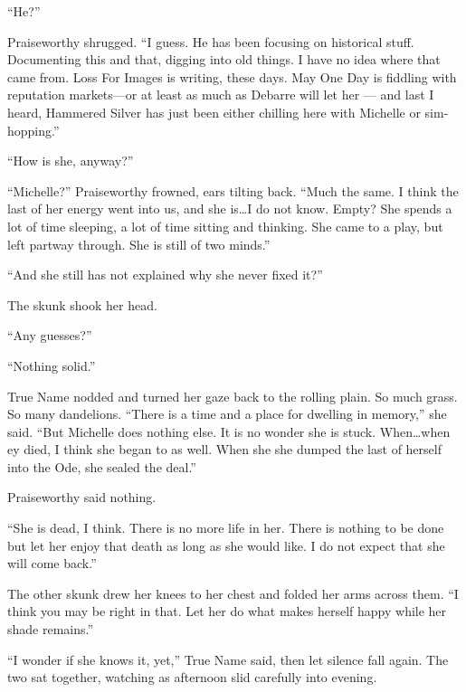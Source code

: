 ``He?''

Praiseworthy shrugged. ``I guess. He has been focusing on historical stuff. Documenting this and that, digging into old things. I have no idea where that came from. Loss For Images is writing, these days. May One Day is fiddling with reputation markets---or at least as much as Debarre will let her — and last I heard, Hammered Silver has just been either chilling here with Michelle or sim-hopping.''

``How is she, anyway?''

``Michelle?'' Praiseworthy frowned, ears tilting back. ``Much the same. I think the last of her energy went into us, and she is\ldots I do not know. Empty? She spends a lot of time sleeping, a lot of time sitting and thinking. She came to a play, but left partway through. She is still of two minds.''

``And she still has not explained why she never fixed it?''

The skunk shook her head.

``Any guesses?''

``Nothing solid.''

True Name nodded and turned her gaze back to the rolling plain. So much grass. So many dandelions. ``There is a time and a place for dwelling in memory,'' she said. ``But Michelle does nothing else. It is no wonder she is stuck. When\ldots when ey died, I think she began to as well. When she she dumped the last of herself into the Ode, she sealed the deal.''

Praiseworthy said nothing.

``She is dead, I think. There is no more life in her. There is nothing to be done but let her enjoy that death as long as she would like. I do not expect that she will come back.''

The other skunk drew her knees to her chest and folded her arms across them. ``I think you may be right in that. Let her do what makes herself happy while her shade remains.''

``I wonder if she knows it, yet,'' True Name said, then let silence fall again. The two sat together, watching as afternoon slid carefully into evening.
